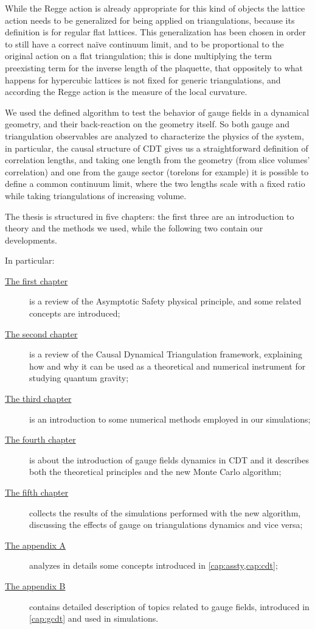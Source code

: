 While the Regge action is already appropriate for this kind of objects the
lattice action needs to be generalized for being applied on triangulations,
because its definition is for regular flat lattices.
This generalization has been chosen in order to still have a correct naïve
continuum limit, and to be proportional to the original action on a flat
triangulation; this is done multiplying the term preexisting term for the
inverse length of the plaquette, that oppositely to what happens for hypercubic
lattices is not fixed for generic triangulations, and according the Regge
action is the measure of the local curvature.
\newline

We used the defined algorithm to test the behavior of gauge fields in a
dynamical geometry, and their back-reaction on the geometry itself.
So both gauge and triangulation observables are analyzed to characterize the
physics of the system, in particular, the causal structure of CDT gives us a
straightforward definition of correlation lengths, and taking one length from
the geometry (from slice volumes' correlation) and one from the gauge sector
(torelons for example) it is possible to define a common continuum limit, where
the two lengths scale with a fixed ratio while taking triangulations of
increasing volume.

\vspace{20pt}

The thesis is structured in five chapters: the first three are an introduction
to theory and the methods we used, while the following two contain our
developments.

In particular:
\begin{description}
	\item[{\hyperref[cap:assty]{The first chapter}}] is a review of the
		Asymptotic Safety physical principle, and some related concepts are
		introduced;
	\item[{\hyperref[cap:cdt]{The second chapter}}] is a review of the Causal
		Dynamical Triangulation framework, explaining how and why it can be
		used as a theoretical and numerical instrument for studying quantum
		gravity;
	\item[{\hyperref[cap:nummet]{The third chapter}}] is an introduction to
		some numerical methods employed in our simulations;
	\item[{\hyperref[cap:gcdt]{The fourth chapter}}] is about the introduction
		of gauge fields dynamics in CDT and it describes both the theoretical
		principles and the new Monte Carlo algorithm;
	\item[{\hyperref[cap:res]{The fifth chapter}}] collects the results of the
		simulations performed with the new algorithm, discussing the effects of
		gauge on triangulations dynamics and vice versa;
	\item[{\hyperref[cap:misc]{The appendix A}}] analyzes in details some
		concepts introduced in \cref{cap:assty,cap:cdt};
	\item[{\hyperref[cap:gaugeapp]{The appendix B}}] contains detailed
		description of topics related to gauge fields, introduced in
		\cref{cap:gcdt} and used in simulations.
\end{description}
